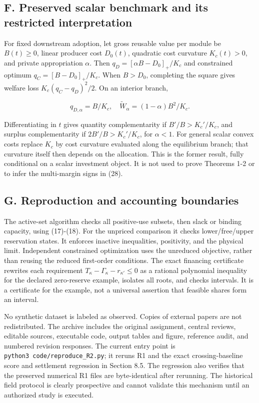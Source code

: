 \documentclass[
  11pt,
]{article}
\begin{document}
\subsection{F. Preserved scalar benchmark and its restricted
interpretation}\label{f.-preserved-scalar-benchmark-and-its-restricted-interpretation}

For fixed downstream adoption, let gross reusable value per module be
\(B(t)\geq0\), linear producer cost \(D_0(t)\), quadratic cost curvature
\(K_c(t)>0\), and private appropriation \(\alpha\). Then
\(q_D=[\alpha B-D_0]_+/K_c\) and constrained optimum
\(q_C=[B-D_0]_+/K_c\). When \(B>D_0\), completing the square gives
welfare loss \(K_c(q_C-q_D)^2/2\). On an interior branch,

\[q_{D,\alpha}=B/K_c,\quad
\widetilde W_\alpha=(1-\alpha)B^2/K_c. \tag{A4}\]

Differentiating in \(t\) gives quantity complementarity if
\(B'/B>K_c'/K_c\), and surplus complementarity if \(2B'/B>K_c'/K_c\),
for \(\alpha<1\). For general scalar convex costs replace \(K_c\) by
cost curvature evaluated along the equilibrium branch; that curvature
itself then depends on the allocation. This is the former result, fully
conditional on a scalar investment object. It is not used to prove
Theorems 1-2 or to infer the multi-margin signs in (28).

\subsection{G. Reproduction and accounting
boundaries}\label{g.-reproduction-and-accounting-boundaries}

The active-set algorithm checks all positive-use subsets, then slack or
binding capacity, using (17)-(18). For the unpriced comparison it checks
lower/free/upper reservation states. It enforces inactive inequalities,
positivity, and the physical limit. Independent constrained optimization
uses the unreduced objective, rather than reusing the reduced
first-order conditions. The exact financing certificate rewrites each
requirement \(T_\kappa-\Gamma_\kappa-r_{\kappa'}\leq0\) as a rational
polynomial inequality for the declared zero-reserve example, isolates
all roots, and checks intervals. It is a certificate for the example,
not a universal assertion that feasible shares form an interval.

No synthetic dataset is labeled as observed. Copies of external papers
are not redistributed. The archive includes the original assignment,
central reviews, editable sources, executable code, output tables and
figure, reference audit, and numbered revision responses. The current
entry point is \texttt{python3\ code/reproduce\_R2.py}; it reruns R1 and
the exact crossing-baseline score and settlement regression in Section
8.5. The regression also verifies that the preserved numerical R1 files
are byte-identical after rerunning. The historical field protocol is
clearly prospective and cannot validate this mechanism until an
authorized study is executed.
\end{document}
